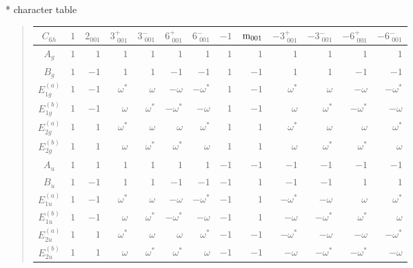 \documentclass[fleqn,10pt,landscape]{jsarticle}
\begin{document}
* character table
\begin{quote}
\begin{tabular}{crrrrrrrrrrrr} \hline \hline
$ C_{6h} $ & $ 1 $ & $ 2{}_{001} $ & $ 3^{+}_{\,\,001} $ & $ 3^{-}_{\,\,001} $ & $ 6^{+}_{\,\,001} $ & $ 6^{-}_{\,\,001} $ & $ -1 $ & $ {\rm m}_{001} $ & $ -3^{+}_{\,\,001} $ & $ -3^{-}_{\,\,001} $ & $ -6^{+}_{\,\,001} $ & $ -6^{-}_{\,\,001} $ \\ \hline
$ A_{g} $ & $ 1 $ & $ 1 $ & $ 1 $ & $ 1 $ & $ 1 $ & $ 1 $ & $ 1 $ & $ 1 $ & $ 1 $ & $ 1 $ & $ 1 $ & $ 1 $ \\
$ B_{g} $ & $ 1 $ & $ -1 $ & $ 1 $ & $ 1 $ & $ -1 $ & $ -1 $ & $ 1 $ & $ -1 $ & $ 1 $ & $ 1 $ & $ -1 $ & $ -1 $ \\
$ E_{1g}^{(a)} $ & $ 1 $ & $ -1 $ & $ \omega^{*} $ & $ \omega $ & $ - \omega $ & $ - \omega^{*} $ & $ 1 $ & $ -1 $ & $ \omega^{*} $ & $ \omega $ & $ - \omega $ & $ - \omega^{*} $ \\
$ E_{1g}^{(b)} $ & $ 1 $ & $ -1 $ & $ \omega $ & $ \omega^{*} $ & $ - \omega^{*} $ & $ - \omega $ & $ 1 $ & $ -1 $ & $ \omega $ & $ \omega^{*} $ & $ - \omega^{*} $ & $ - \omega $ \\
$ E_{2g}^{(a)} $ & $ 1 $ & $ 1 $ & $ \omega^{*} $ & $ \omega $ & $ \omega $ & $ \omega^{*} $ & $ 1 $ & $ 1 $ & $ \omega^{*} $ & $ \omega $ & $ \omega $ & $ \omega^{*} $ \\
$ E_{2g}^{(b)} $ & $ 1 $ & $ 1 $ & $ \omega $ & $ \omega^{*} $ & $ \omega^{*} $ & $ \omega $ & $ 1 $ & $ 1 $ & $ \omega $ & $ \omega^{*} $ & $ \omega^{*} $ & $ \omega $ \\
$ A_{u} $ & $ 1 $ & $ 1 $ & $ 1 $ & $ 1 $ & $ 1 $ & $ 1 $ & $ -1 $ & $ -1 $ & $ -1 $ & $ -1 $ & $ -1 $ & $ -1 $ \\
$ B_{u} $ & $ 1 $ & $ -1 $ & $ 1 $ & $ 1 $ & $ -1 $ & $ -1 $ & $ -1 $ & $ 1 $ & $ -1 $ & $ -1 $ & $ 1 $ & $ 1 $ \\
$ E_{1u}^{(a)} $ & $ 1 $ & $ -1 $ & $ \omega^{*} $ & $ \omega $ & $ - \omega $ & $ - \omega^{*} $ & $ -1 $ & $ 1 $ & $ - \omega^{*} $ & $ - \omega $ & $ \omega $ & $ \omega^{*} $ \\
$ E_{1u}^{(b)} $ & $ 1 $ & $ -1 $ & $ \omega $ & $ \omega^{*} $ & $ - \omega^{*} $ & $ - \omega $ & $ -1 $ & $ 1 $ & $ - \omega $ & $ - \omega^{*} $ & $ \omega^{*} $ & $ \omega $ \\
$ E_{2u}^{(a)} $ & $ 1 $ & $ 1 $ & $ \omega^{*} $ & $ \omega $ & $ \omega $ & $ \omega^{*} $ & $ -1 $ & $ -1 $ & $ - \omega^{*} $ & $ - \omega $ & $ - \omega $ & $ - \omega^{*} $ \\
$ E_{2u}^{(b)} $ & $ 1 $ & $ 1 $ & $ \omega $ & $ \omega^{*} $ & $ \omega^{*} $ & $ \omega $ & $ -1 $ & $ -1 $ & $ - \omega $ & $ - \omega^{*} $ & $ - \omega^{*} $ & $ - \omega $ \\
 \hline \hline
\end{tabular}
\end{quote}
\end{document}
